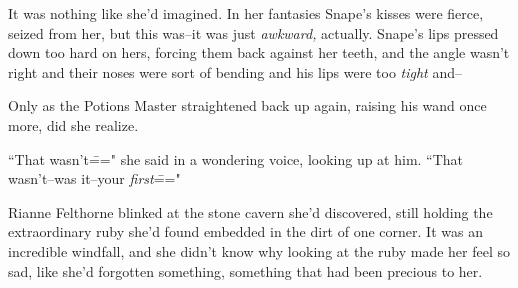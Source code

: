 It was nothing like she'd imagined. In her fantasies Snape's kisses were fierce, seized from her, but this was\---it was just \emph{awkward,} actually. Snape's lips pressed down too hard on hers, forcing them back against her teeth, and the angle wasn't right and their noses were sort of bending and his lips were too \emph{tight} and\---

Only as the Potions Master straightened back up again, raising his wand once more, did she realize.

``That wasn't\===" she said in a wondering voice, looking up at him. ``That wasn't\---was it\---your \emph{first}\==="

Rianne Felthorne blinked at the stone cavern she'd discovered, still holding the extraordinary ruby she'd found embedded in the dirt of one corner. It was an incredible windfall, and she didn't know why looking at the ruby made her feel so sad, like she'd forgotten something, something that had been precious to her.

